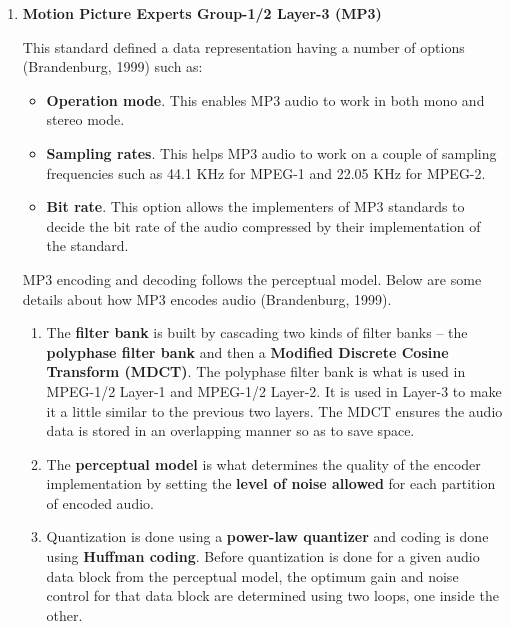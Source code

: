 \documentclass[12pt,svgnames,smaller]{article} %
\begin{document}
	\begin{enumerate}
		
		\item \textbf{Motion Picture Experts Group-1/2 Layer-3 (MP3)}
		
		This standard defined a data representation having a number of options (Brandenburg, 1999) such as:
		
		\begin{itemize}
			\item \textbf{Operation mode}. This enables MP3 audio to work in both mono and stereo mode.
			\item \textbf{Sampling rates}. This helps MP3 audio to work on a couple of sampling frequencies such as 44.1 KHz for MPEG-1 and 22.05 KHz for MPEG-2.
			\item \textbf{Bit rate}. This option allows the implementers of MP3 standards to decide the bit rate of the audio compressed by their implementation of the standard.
		\end{itemize}
		
		MP3 encoding and decoding follows the perceptual model. Below are some details about how MP3 encodes audio (Brandenburg, 1999).
		
		\begin{enumerate}
			\item The \textbf{filter bank} is built by cascading two kinds of filter banks – the \textbf{polyphase filter bank} and then a \textbf{Modified Discrete Cosine Transform (MDCT)}. The polyphase filter bank is what is used in MPEG-1/2 Layer-1 and MPEG-1/2 Layer-2. It is used in Layer-3 to make it a little similar to the previous two layers. The MDCT ensures the audio data is stored in an overlapping manner so as to save space.
			\item The \textbf{perceptual model} is what determines the quality of the encoder implementation by setting the \textbf{level of noise allowed} for each partition of encoded audio. 
			\item Quantization is done using a \textbf{power-law quantizer} and coding is done using \textbf{Huffman coding}. Before quantization is done for a given audio data block from the perceptual model, the optimum gain and noise control for that data block are determined using two loops, one inside the other. 
			

\end{enumerate}
\end{enumerate}
\end{document}
